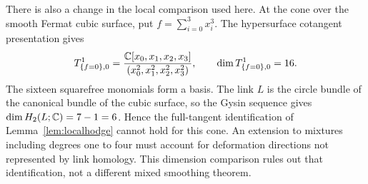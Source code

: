 There is also a change in the local comparison used here.  At the cone
over the smooth Fermat cubic surface, put $f=\sum_{i=0}^3x_i^3$.
The hypersurface cotangent presentation gives
\[
 T^1_{\{f=0\},0}
 =\frac{\mathbb{C}[x_0,x_1,x_2,x_3]}{(x_0^2,x_1^2,x_2^2,x_3^2)},
 \qquad \dim T^1_{\{f=0\},0}=16.
\]
The sixteen squarefree monomials form a basis.  The link $L$ is the
circle bundle of the canonical bundle of the cubic surface, so the
Gysin sequence gives $\dim H_2(L;\mathbb{C})=7-1=6$.  Hence the full-tangent
identification of Lemma~\ref{lem:localhodge} cannot hold for this cone.
An extension to mixtures including degrees one to four must account for
deformation directions not represented by link homology.  This dimension
comparison rules out that identification, not a different mixed
smoothing theorem.
